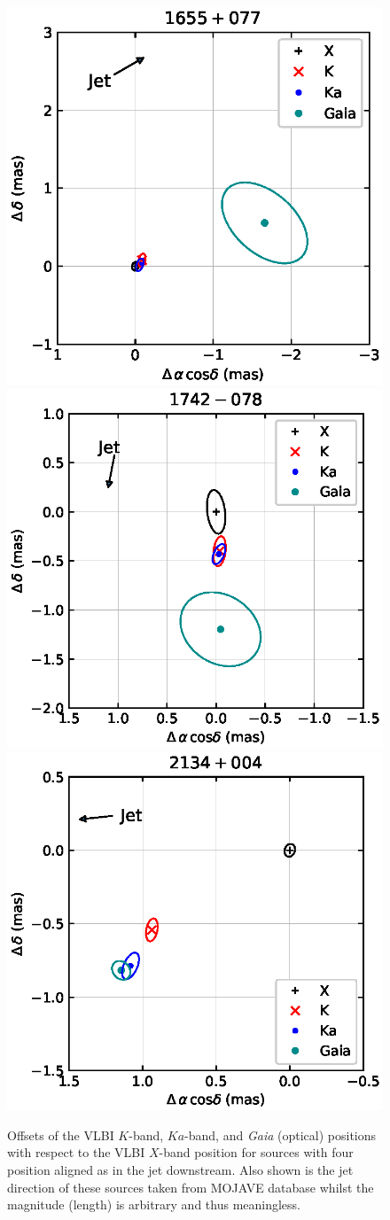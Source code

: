 \documentclass[referee]{aa}        %
\begin{document}
\begin{appendix}
\begin{figure}[hbtp]
        \includegraphics[width=0.45\columnwidth]{figs/1655+077}
        \includegraphics[width=0.45\columnwidth]{figs/1742-078}
        \includegraphics[width=0.45\columnwidth]{figs/2134+004}
        \caption[]{\label{fig:jet-down}
            Offsets of the VLBI $K$-band, $Ka$-band, and {\it Gaia} (optical) positions with respect to the VLBI $X$-band position for sources with four position aligned as in the jet downstream.
            Also shown is the jet direction of these sources taken from MOJAVE database whilst the magnitude (length) is arbitrary and thus meaningless.
        }
    \end{figure}


\end{appendix}
\end{document}
